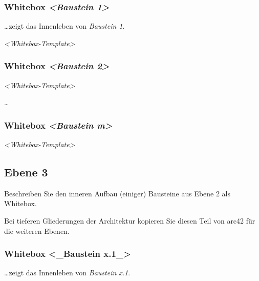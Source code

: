 \documentclass[]{article}
\begin{document}
\hypertarget{_whitebox_emphasis_baustein_1_emphasis}{%
\subsubsection{\texorpdfstring{Whitebox \emph{\textless{}Baustein
1\textgreater{}}}{Whitebox \textless{}Baustein 1\textgreater{}}}\label{_whitebox_emphasis_baustein_1_emphasis}}

\ldots{}zeigt das Innenleben von \emph{Baustein 1}.

\emph{\textless{}Whitebox-Template\textgreater{}}

\hypertarget{_whitebox_emphasis_baustein_2_emphasis}{%
\subsubsection{\texorpdfstring{Whitebox \emph{\textless{}Baustein
2\textgreater{}}}{Whitebox \textless{}Baustein 2\textgreater{}}}\label{_whitebox_emphasis_baustein_2_emphasis}}

\emph{\textless{}Whitebox-Template\textgreater{}}

\ldots{}

\hypertarget{_whitebox_emphasis_baustein_m_emphasis}{%
\subsubsection{\texorpdfstring{Whitebox \emph{\textless{}Baustein
m\textgreater{}}}{Whitebox \textless{}Baustein m\textgreater{}}}\label{_whitebox_emphasis_baustein_m_emphasis}}

\emph{\textless{}Whitebox-Template\textgreater{}}

\hypertarget{_ebene_3}{%
\subsection{Ebene 3}\label{_ebene_3}}

Beschreiben Sie den inneren Aufbau (einiger) Bausteine aus Ebene 2 als
Whitebox.

Bei tieferen Gliederungen der Architektur kopieren Sie diesen Teil von
arc42 für die weiteren Ebenen.

\hypertarget{_whitebox_baustein_x_1}{%
\subsubsection{Whitebox \textless{}\_Baustein
x.1\_\textgreater{}}\label{_whitebox_baustein_x_1}}

\ldots{}zeigt das Innenleben von \emph{Baustein x.1}.
\end{document}
